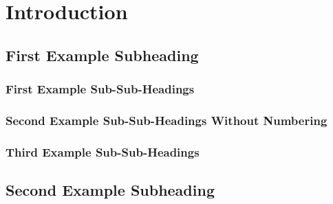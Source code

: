 \section{Introduction}

\lipsum[1-1]

\subsection{First Example Subheading}

\subsubsection{First Example Sub-Sub-Headings}

\subsubsection*{Second Example Sub-Sub-Headings Without Numbering}

\subsubsection{Third Example Sub-Sub-Headings}

\subsection{Second Example Subheading}
